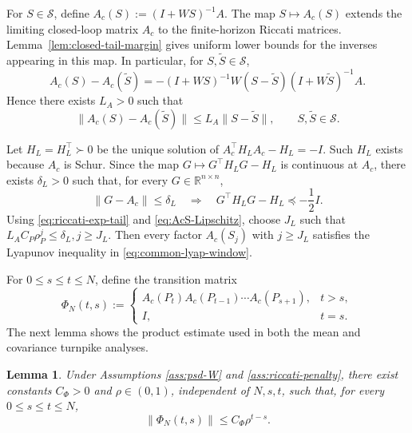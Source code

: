 \documentclass[10pt,journal,twoside]{IEEEtran}
\newtheorem{lemma}{Lemma}
\theoremstyle{definition}
\theoremstyle{remark}
\begin{document}
For \(S\in\mathscr S\), define
$A_c(S):=(I+WS)^{-1}A$. The map \(S\mapsto A_c(S)\) extends the limiting closed-loop matrix \(A_c\) to the finite-horizon Riccati matrices.  Lemma~\ref{lem:closed-tail-margin} gives uniform lower bounds for the inverses appearing in this map.  In particular, for \(S,\widetilde S\in\mathscr S\),
\begin{equation*}
		A_c(S)-A_c(\widetilde S)
		=-(I+WS)^{-1}W(S-\widetilde S)(I+W\widetilde S)^{-1}A .
\end{equation*}
Hence there exists \(L_A>0\) such that
\begin{equation}
	\|A_c(S)-A_c(\widetilde S)\|
	\le
	L_A\|S-\widetilde S\|,
	\qquad S,\widetilde S\in\mathscr S .
	\label{eq:AcS-Lipschitz}
\end{equation}

Let \(H_L=H_L^\top\succ0\) be the unique solution of $A_c^\top H_LA_c-H_L=-I$.
Such \(H_L\) exists because \(A_c\) is Schur. Since the map \(G\mapsto G^\top H_LG-H_L\) is continuous at \(A_c\), there exists \(\delta_L>0\) such that, for every \(G\in\mathbb R^{n\times n}\),
\begin{equation}
	\|G-A_c\|\le\delta_L
	\quad\Longrightarrow\quad
	G^\top H_LG-H_L\preceq-\frac12 I .
	\label{eq:common-lyap-window}
\end{equation}
Using \eqref{eq:riccati-exp-tail} and \eqref{eq:AcS-Lipschitz}, choose
\(J_L\) such that
\(
L_AC_P\rho_P^j\le\delta_L, j\ge J_L .
\)
Then every factor \(A_c(S_j)\) with \(j\ge J_L\) satisfies the Lyapunov inequality in \eqref{eq:common-lyap-window}.

{For \(0\le s\le t\le N\), define the transition matrix}
\begin{equation}
	\Phi_N(t,s):=
	\begin{cases}
		A_c(P_t)A_c(P_{t-1})\cdots A_c(P_{s+1}),
		& t>s,\\
		I, & t=s .
	\end{cases}
	\label{eq:PhiN-def}
\end{equation}
{The next lemma shows the product estimate used in both the mean and covariance turnpike analyses.}

\begin{lemma}
	\label{lem:uniform-product}
	{Under Assumptions \ref{ass:psd-W} and \ref{ass:riccati-penalty},}
	there exist constants \(C_\Phi>0\) and \(\rho\in(0,1)\), independent
	of \(N,s,t\), such that, for every \(0\le s\le t\le N\),
	\begin{equation}
		\|\Phi_N(t,s)\|
		\le
		C_\Phi\rho^{t-s} .
		\label{eq:uniform-product-bound}
	\end{equation}
\end{lemma}
\end{document}
